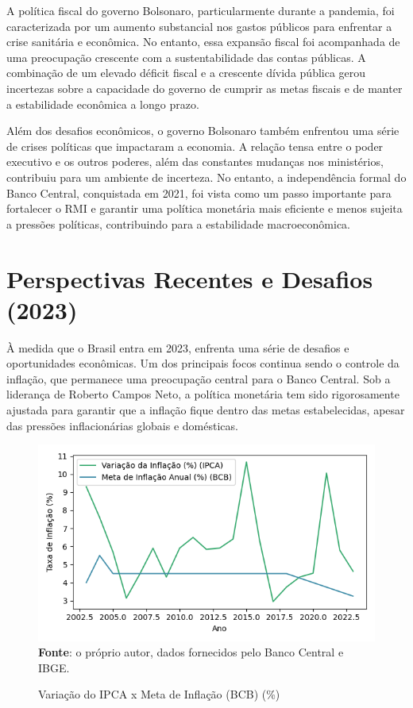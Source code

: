 \documentclass[12pt,oneside,a4paper,chapter=TITLE,english,brazil,sumario=abnt-6027-2012]{abntex2}
\begin{document}
A política fiscal do governo Bolsonaro, particularmente durante a pandemia, foi caracterizada por um aumento substancial nos gastos públicos para enfrentar a crise sanitária e econômica. No entanto, essa expansão fiscal foi acompanhada de uma preocupação crescente com a sustentabilidade das contas públicas. A combinação de um elevado déficit fiscal e a crescente dívida pública gerou incertezas sobre a capacidade do governo de cumprir as metas fiscais e de manter a estabilidade econômica a longo prazo.

Além dos desafios econômicos, o governo Bolsonaro também enfrentou uma série de crises políticas que impactaram a economia. A relação tensa entre o poder executivo e os outros poderes, além das constantes mudanças nos ministérios, contribuiu para um ambiente de incerteza. No entanto, a independência formal do Banco Central, conquistada em 2021, foi vista como um passo importante para fortalecer o RMI e garantir uma política monetária mais eficiente e menos sujeita a pressões políticas, contribuindo para a estabilidade macroeconômica.

\section{Perspectivas Recentes e Desafios (2023)}

À medida que o Brasil entra em 2023, enfrenta uma série de desafios e oportunidades econômicas. Um dos principais focos continua sendo o controle da inflação, que permanece uma preocupação central para o Banco Central. Sob a liderança de Roberto Campos Neto, a política monetária tem sido rigorosamente ajustada para garantir que a inflação fique dentro das metas estabelecidas, apesar das pressões inflacionárias globais e domésticas.

\begin{figure}[H]
	
	\caption{Variação do IPCA x Meta de Inflação (BCB) (\%)}
	
	\includegraphics[]{fig/ibge_ipca_bcb_meta_99_23_t.png}\\
	
	\footnotesize \textbf{Fonte}: o próprio autor, dados fornecidos pelo Banco Central e IBGE.
	
\end{figure}
\end{document}
